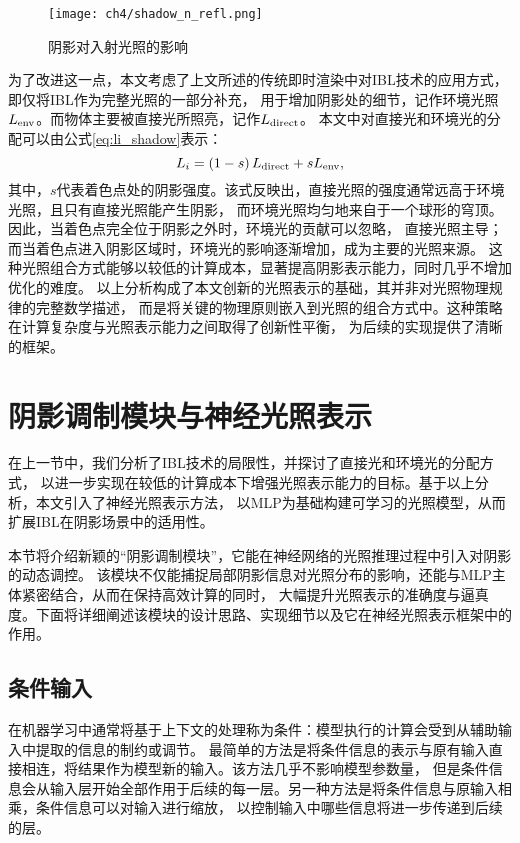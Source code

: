 \begin{figure}[htb]
  \centering
  \texttt{[image: ch4/shadow\_n\_refl.png]}
  \caption{阴影对入射光照的影响}
  \label{fig:shadow_n_refl}
\end{figure}

为了改进这一点，本文考虑了上文所述的传统即时渲染中对IBL技术的应用方式，即仅将IBL作为完整光照的一部分补充，
用于增加阴影处的细节，记作环境光照$L_{\rm{env}}$。而物体主要被直接光所照亮，记作$L_{\rm{direct}}$。
本文中对直接光和环境光的分配可以由公式\eqref{eq:li_shadow}表示：
\begin{equation}
  \label{eq:li_shadow}
  L_i=\left(1-s\right)L_{\rm{direct}}+sL_{\rm{env}},
  \end{equation}
其中，$s$代表着色点处的阴影强度。该式反映出，直接光照的强度通常远高于环境光照，且只有直接光照能产生阴影，
而环境光照均匀地来自于一个球形的穹顶。因此，当着色点完全位于阴影之外时，环境光的贡献可以忽略，
直接光照主导；而当着色点进入阴影区域时，环境光的影响逐渐增加，成为主要的光照来源。
这种光照组合方式能够以较低的计算成本，显著提高阴影表示能力，同时几乎不增加优化的难度。
以上分析构成了本文创新的光照表示的基础，其并非对光照物理规律的完整数学描述，
而是将关键的物理原则嵌入到光照的组合方式中。这种策略在计算复杂度与光照表示能力之间取得了创新性平衡，
为后续的实现提供了清晰的框架。

\section{阴影调制模块与神经光照表示}

在上一节中，我们分析了IBL技术的局限性，并探讨了直接光和环境光的分配方式，
以进一步实现在较低的计算成本下增强光照表示能力的目标。基于以上分析，本文引入了神经光照表示方法，
以MLP为基础构建可学习的光照模型，从而扩展IBL在阴影场景中的适用性。

本节将介绍新颖的“阴影调制模块”，它能在神经网络的光照推理过程中引入对阴影的动态调控。
该模块不仅能捕捉局部阴影信息对光照分布的影响，还能与MLP主体紧密结合，从而在保持高效计算的同时，
大幅提升光照表示的准确度与逼真度。下面将详细阐述该模块的设计思路、实现细节以及它在神经光照表示框架中的作用。

\subsection{条件输入}

在机器学习中通常将基于上下文的处理称为条件：模型执行的计算会受到从辅助输入中提取的信息的制约或调节。
最简单的方法是将条件信息的表示与原有输入直接相连，将结果作为模型新的输入。该方法几乎不影响模型参数量，
但是条件信息会从输入层开始全部作用于后续的每一层。另一种方法是将条件信息与原输入相乘，条件信息可以对输入进行缩放，
以控制输入中哪些信息将进一步传递到后续的层。

